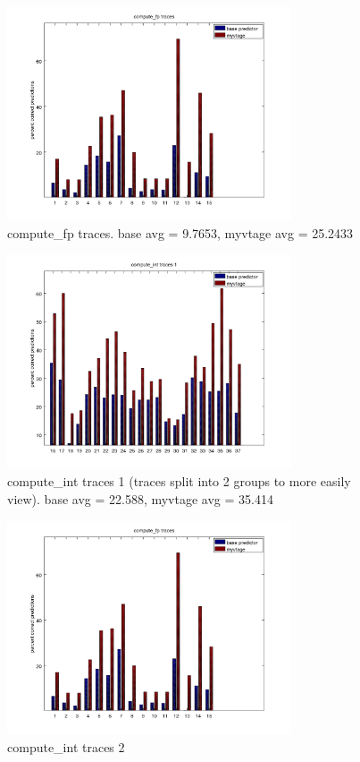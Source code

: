 \documentclass[12pt]{article}
\begin{document}
	\begin{figure}[p]
		\centering
		\includegraphics[width=0.75\textwidth]{compute_fptraces1.png}
		\caption{compute\_fp traces. base avg = 9.7653, myvtage avg = 25.2433}
		\label{fig:computefp1}
	\end{figure}
	\begin{figure}[p]
		\centering
		\includegraphics[width=0.75\textwidth]{compute_inttraces1.png}
		\caption{compute\_int traces 1 (traces split into 2 groups to more easily view). base avg = 22.588, myvtage avg = 35.414}
		\label{fig:computeint1}
	\end{figure}
	\begin{figure}[p]
		\centering
		\includegraphics[width=0.75\textwidth]{compute_inttraces2.png}
		\caption{compute\_int traces 2}
		\label{fig:computeint2}
	\end{figure}
\end{document}
